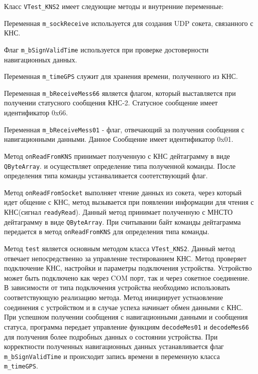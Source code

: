 Класс \texttt{VTest\_KNS2} имеет следующие методы и внутренние переменные:
\begin{enum}
	\item Переменная \texttt{m\_sockReceive} используется для создания UDP сокета, связанного с КНС.

	\item Флаг \texttt{m\_bSignValidTime} используется при проверке достоверности навигационных данных.

	\item Переменная \texttt{m\_timeGPS} служит для хранения времени, полученного из КНС.

	\item Переменная \texttt{m\_bReceiveMess66} является флагом, который выставляется при получении статусного
		сообщения КНС-2. Статусное сообщение имеет идентификатор 0x66.

	\item Переменная \texttt{m\_bReceiveMess01} - флаг, отвечающий за получения сообщения с навигационными данными.
		Данное Сообщение имеет идентификатор 0x01.

	\item Метод \texttt{onReadFromKNS} принимает полученную с КНС дейтаграмму в виде \texttt{QByteArray}.
		и осуществляет определение типа полученной команды. После определения типа команды устанваливается
		соотетствующий флаг.

	\item Метод \texttt{onReadFromSocket} выполняет чтение данных из сокета, через который идет общение с КНС,
		метод вызывается при появлении информации для чтения с КНС(сигнал \texttt{readyRead}).
		Данный метод принимает полученную с МНСТО дейтаграмму в виде \texttt{QByteArray}.
		При считывании байт команды дейтаграмма передается в метод \texttt{onReadFromKNS} для определения типа
		команды.

	\item Метод \texttt{test} является основным методом класса \texttt{VTest\_KNS2}. Данный метод отвечает
		непосредственно за управление тестированием КНС. Метод проверяет подключение КНС, настройки и
		параметры подключения устройства. Устройство может быть подключено как через COM порт, так и через
		сокетное соединение. В зависимости от типа подключения устройства необходимо использовать
		соответствующую реализацию метода. Метод инициирует устнаовление соединения с устройством и в случае
		успеха начинает обмен данными с КНС. При успешном получении сообщения с навигационными данными и сообщения
		статуса, программа передает управление функциям \texttt{decodeMes01} и \texttt{decodeMes66} для
		получения более подробных данных о состоянии устройства. При корректности полученных навигационных
		данных устанавливается флаг \texttt{m\_bSignValidTime} и происходит запись времени в переменную класса
		\texttt{m\_timeGPS}.


\end{enum}
